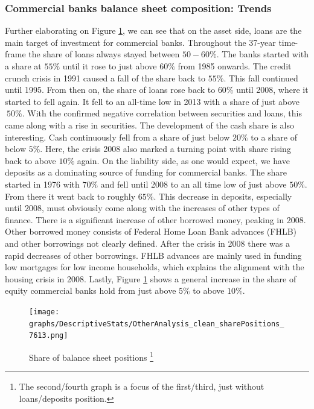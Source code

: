 \documentclass[12pt, a4paper]{article} %
\begin{document}
\subsubsection{Commercial banks balance sheet composition: Trends}
\label{sec:shareBalanceSheetAccounts}
Further elaborating on Figure \ref{fig:share_both}, we can see that on the asset side, loans are the main target of investment for commercial banks. Throughout the 37-year time-frame the share of loans always stayed between $50-60\%$. The banks started with a share at $55\%$ until it rose to just above $60\%$ from 1985 onwards. The credit crunch crisis in 1991 caused a fall of the share back to $55\%$. This fall continued until 1995. From then on, the share of loans rose back to $60\%$ until 2008, where it started to fell again. It fell to an all-time low in 2013 with a share of just above $~50\%$. With the confirmed negative correlation between securities and loans, this came along with a rise in securities. 
The development of the cash share is also interesting. Cash continuously fell from a share of just below $20\%$ to a share of below $5\%$. Here, the crisis 2008 also marked a turning point with share rising back to above $10\%$ again. 
On the liability side, as one would expect, we have deposits as a dominating source of funding for commercial banks. The share started in 1976 with $70\%$ and fell until 2008 to an all time low of just above $50\%$. From there it went back to roughly $65\%$. This decrease in deposits, especially until 2008, must obviously come along with the increases of other types of finance. There is a significant increase of other borrowed money, peaking in 2008. Other borrowed money consists of Federal Home Loan Bank advances (FHLB) and other borrowings not clearly defined. After the crisis in 2008 there was a rapid decreases of other borrowings. FHLB advances are mainly used in funding low mortgages for low income households, which explains the alignment with the housing crisis in 2008.  Lastly, Figure \ref{fig:share_both} shows a general increase in the share of equity commercial banks hold from just above $5\%$ to above $10\%$. 

\begin{figure}[hbtp]
\begin{minipage}{\textwidth}
\centering
\caption[1]{Share of balance sheet positions \footnote{The second/fourth graph is a focus of the first/third, just without loans/deposits position.} }
\texttt{[image: graphs/DescriptiveStats/OtherAnalysis\_clean\_sharePositions\_7613.png]}
\label{fig:share_both}
\end{minipage}
\end{figure}
 
\end{document}
